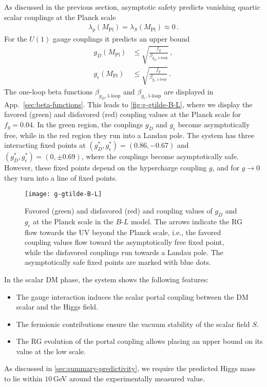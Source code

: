 \documentclass[aps,prd,twocolumn,preprintnumbers,superscriptaddress,nobibnotes,floatfix,longbibliography]{revtex4-1}
\begin{document}
As discussed in the previous section, asymptotic safety predicts vanishing quartic scalar couplings at the Planck scale
\begin{align}
 \lambda_p (M_\text{Pl}) = \lambda_S (M_\text{Pl}) \approx 0 \,.
\end{align}
For the $U(1)$ gauge couplings it predicts an upper bound
\begin{align}
 g_D (M_\text{Pl}) &\leq \sqrt{\frac{f_g}{\beta_{g_D,\text{1-loop}}}} \nonumber \,, \\
  g_\epsilon  (M_\text{Pl}) &\leq \sqrt{\frac{f_g}{\beta_{g_\epsilon  ,\text{1-loop}}}} \,.
 \label{eq:upbound-g}
\end{align}
The one-loop beta functions $\beta_{g_D,\text{1-loop}}$ and $\beta_{ g_\epsilon ,\text{1-loop}}$ are displayed in App.~\ref{sec:beta-functions}.
This leads to \autoref{fig:g-gtilde-B-L}, where we display the favored (green) and disfavored (red) coupling values at the Planck scale for $f_g=0.04$.
In the green region, the couplings $g_D$ and $g_\epsilon$ become asymptotically free,
while in the red region they run into a Landau pole.
The system has three interacting fixed points at $(g_D^*,g_\epsilon^*) =(0.86,-0.67)$ and $(g_D^*,g_\epsilon^*) =(0, \pm 0.69)$, where the couplings become asymptotically safe.
However, these fixed points depend on the hypercharge coupling $g$, and for $g\to0$ they turn into a line of fixed points. 

\begin{figure}[t]
\texttt{[image: g-gtilde-B-L]}
\caption{
Favored (green) and disfavored (red) and coupling values of $g_D$ and $g_\epsilon $ at the Planck scale in the $B$-$L$ model.
The arrows indicate the RG flow towards the UV beyond the Planck scale, i.e.,
the favored coupling values flow toward the asymptotically free fixed point,
while the disfavored couplings run towards a Landau pole.
The asymptotically safe fixed points are marked with blue dots.
}
\label{fig:g-gtilde-B-L}
\end{figure}


In the scalar DM phase, the system shows the following features:
\begin{itemize}
\item The gauge interaction induces the scalar portal coupling between the DM scalar and the Higgs field.
\item The fermionic contributions ensure the vacuum stability of the scalar field $S$.
\item The RG evolution of the portal coupling allows placing an upper bound on its value at the low scale.
\end{itemize}
As discussed in \autoref{sec:summary-predictivity}, we require the predicted Higgs mass to lie within $10$\,GeV around the experimentally measured value.
\end{document}
